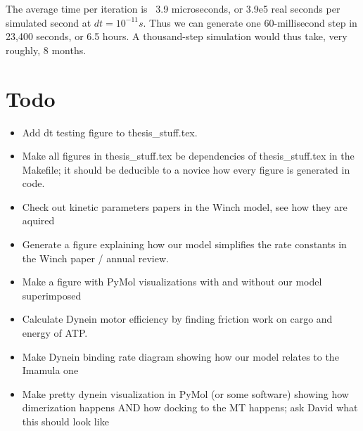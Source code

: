 \documentclass[10pt]{article} %
\begin{document}
The average time per iteration is ~3.9 microseconds, or 3.9e5 real seconds per simulated second at $dt=10^{-11}s$. Thus we can generate one 60-millisecond step in 23,400 seconds, or 6.5 hours. A thousand-step simulation would thus take, very roughly, 8 months.\\

\section{Todo}
\begin{itemize}
\item Add dt testing figure to thesis\_stuff.tex.
\item Make all figures in thesis\_stuff.tex be dependencies of thesis\_stuff.tex in the Makefile; it should be deducible to a novice how every figure is generated in code.
\item Check out kinetic parameters papers in the Winch model, see how they are aquired
\item Generate a figure explaining how our model simplifies the rate constants in the Winch paper / annual review.
\item Make a figure with PyMol visualizations with and without our model superimposed
\item Calculate Dynein motor efficiency by finding friction work on cargo and energy of ATP.
\item Make Dynein binding rate diagram showing how our model relates to the Imamula one
\item Make pretty dynein visualization in PyMol (or some software) showing how dimerization happens AND how docking to the MT happens; ask David what this should look like
\end{itemize}



\end{document}
